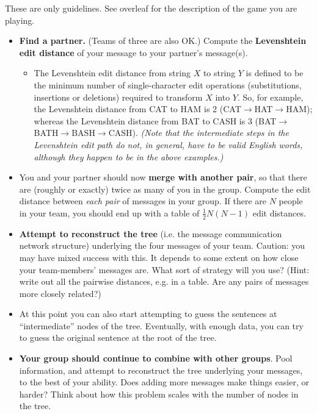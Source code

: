 \documentclass[10pt,letterpaper,english]{article}
\begin{document}
{These are only guidelines. See overleaf for the description of the game you are playing.

\begin{itemize}
\item {\bf Find a partner.} (Teams of three are also OK.) Compute the {\bf Levenshtein edit distance} of your message to your partner's message(s).
\begin{itemize}
\item The Levenshtein edit distance from string $X$ to string $Y$ is defined to be
  the minimum number of single-character edit operations (substitutions, insertions or deletions) required to transform $X$ into $Y$.
  So, for example, the Levenshtein distance from CAT to HAM is 2 (CAT$\to$HAT$\to$HAM); whereas the Levenshtein distance from BAT to CASH is 3 (BAT$\to$BATH$\to$BASH$\to$CASH).
  {\em (Note that the intermediate steps in the Levenshtein edit path do not, in general, have to be valid English words, although they happen to be in the above examples.)}
\end{itemize}
\item You and your partner should now {\bf merge with another pair}, so that there are (roughly or exactly) twice as many of you in the group.
Compute the edit distance between {\em each pair} of messages in your group.
If there are $N$ people in your team, you should end up with a table of $\frac{1}{2}N(N-1)$ edit distances.
\item {\bf Attempt to reconstruct the tree} (i.e. the message communication network structure) underlying the four messages of your team.
Caution: you may have mixed success with this. It depends to some extent on how close your team-members' messages are.
What sort of strategy will you use? (Hint: write out all the pairwise distances, e.g. in a table. Are any pairs of messages more closely related?)
\item At this point you can also start attempting to guess the sentences at ``intermediate'' nodes of the tree.
Eventually, with enough data, you can try to guess the original sentence at the root of the tree.
\item {\bf Your group should continue to combine with other groups}.
Pool information, and attempt to reconstruct the tree underlying your messages, to the best of your ability.
Does adding more messages make things easier, or harder? Think about how this problem scales with the number of nodes in the tree.

\end{itemize}}
\end{document}
